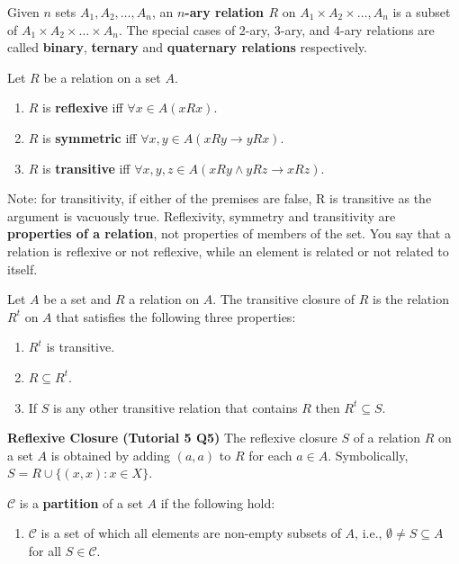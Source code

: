 \documentclass{article}
\begin{document}
\begin{description}
    \item[$n$-ary Relation] Given $n$ sets $A_{1}, A_{2}, \ldots, A_{n}$, an \textbf{$n$-ary relation $R$} on $A_{1} \times A_{2} \times \ldots, A_{n}$ is a subset of $A_{1} \times A_{2} \times \ldots \times A_{n}$. The special cases of 2-ary, 3-ary, and 4-ary relations are called \textbf{binary}, \textbf{ternary} and \textbf{quaternary relations} respectively. 
    \item[Reflexivity, Symmetry, Transitivity] Let $R$ be a relation on a set $A$. 
	\begin{enumerate}
		\item $R$ is \textbf{reflexive} iff $\forall x\in A(xRx)$. 
		\item $R$ is \textbf{symmetric} iff $\forall x, y\in A(xRy \to yRx)$. 
		\item $R$ is \textbf{transitive} iff $\forall x,y,z \in A(xRy \land yRz\to xRz)$.
	\end{enumerate}
	\item Note: for transitivity, if either of the premises are false, R is transitive as the argument is vacuously true. Reflexivity, symmetry and transitivity are \textbf{properties of a relation}, not properties of members of the set. You say that a relation is reflexive or not reflexive, while an element	is related or not related to itself. 
	\item[Transitive Closure]Let $A$ be a set and $R$ a relation on $A$. The transitive closure of $R$ is the relation $R^{t}$ on $A$ that satisfies the following three properties:	
	\begin{enumerate}
		\item $R^{t}$ is transitive.
		\item $R\subseteq R^{t}$.
		\item If $S$ is any other transitive relation that contains $R$ then $R^{t} \subseteq S$.
	\end{enumerate}
	\item \qquad \textbf{Reflexive Closure (Tutorial 5 Q5)} The reflexive closure $S$ of a relation $R$ on a set $A$ is obtained by adding $(a, a)$ to $R$ for each $a \in A$. Symbolically, $S = R\cup \{(x, x):x\in X\}$.
	\item[Partition] $\mathscr{C}$ is a \textbf{partition} of a set $A$ if the following hold: 
	\begin{enumerate}
		\item $\mathscr{C}$ is a set of which all elements are non-empty subsets of $A$, i.e., $\emptyset \neq S \subseteq A$ for all $S\in \mathscr{C}$. 

\end{enumerate}
\end{description}
\end{document}
